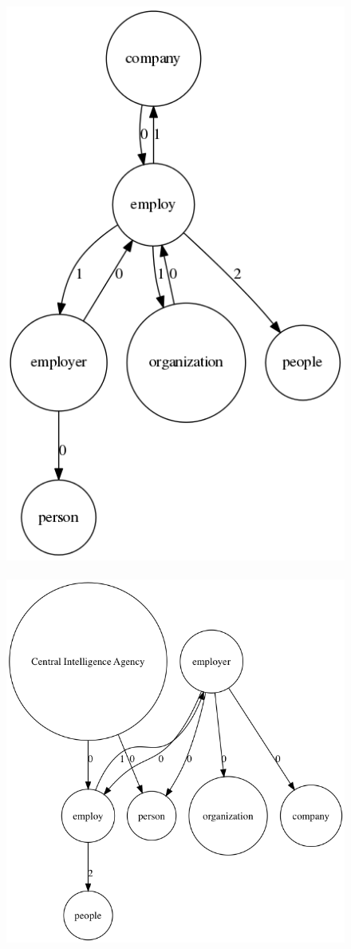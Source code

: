 \documentclass[twoside,b5paper,10pt]{article}
\begin{document}
 \begin{figure}[htb]
  \vspace{3pt}
  \centerline{
  \hbox{
  \hspace{0.0in}
        \includegraphics[scale=0.4]{Figure/employer.png}
        \hspace{0.1\columnwidth}
        \includegraphics[scale=0.4]{Figure/employernew.png}
}}
\end{figure}
\end{document}
